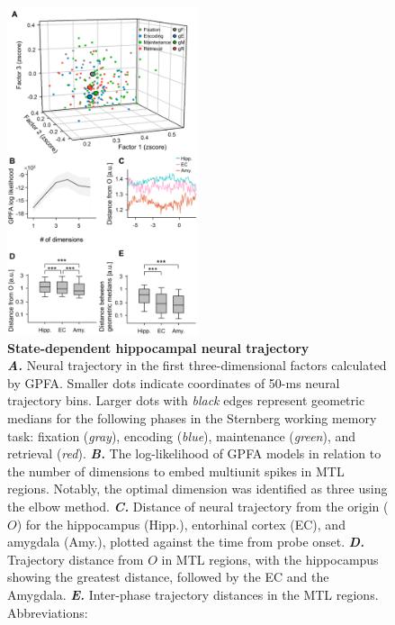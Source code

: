 \documentclass[final,3p,times,twocolumn]{elsarticle}
\begin{document}
        \clearpage
        \begin{figure}[ht]
        	\centering
            \includegraphics[width=0.5\textwidth]{./src/figures/.png/Figure_ID_02.png}
        	\caption{\textbf{
State-dependent hippocampal neural trajectory
}
\smallskip
\\
\textbf{\textit{A.}} Neural trajectory in the first three-dimensional factors calculated by GPFA. Smaller dots indicate coordinates of 50-ms neural trajectory bins. Larger dots with \textit{black} edges represent geometric medians for the following phases in the Sternberg working memory task: fixation (\textit{gray}), encoding (\textit{blue}), maintenance (\textit{green}), and retrieval (\textit{red}). \textbf{\textit{B.}} The log-likelihood of GPFA models in relation to the number of dimensions to embed multiunit spikes in MTL regions. Notably, the optimal dimension was identified as three using the elbow method.  \textbf{\textit{C.}}  Distance of neural trajectory from the origin ($O$) for the hippocampus (Hipp.), entorhinal cortex (EC), and amygdala (Amy.), plotted against the time from probe onset. \textbf{\textit{D.}} Trajectory distance from $O$ in MTL regions, with the hippocampus showing the greatest distance, followed by the EC and the Amygdala. \textbf{\textit{E.}}  Inter-phase trajectory distances in the MTL regions.
Abbreviations:
}
        	\label{fig:02}
        \end{figure}
        \clearpage
\end{document}

